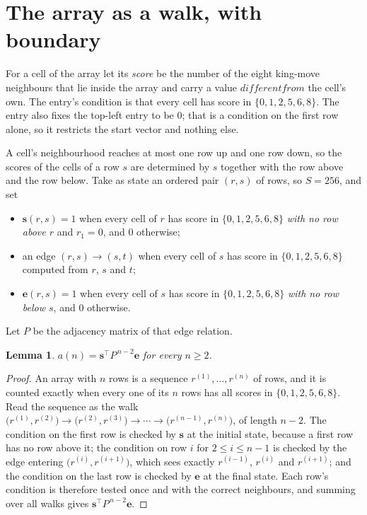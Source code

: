 \documentclass[11pt,a4paper]{article}
\theoremstyle{plain}
\newtheorem{lemma}[theorem]{Lemma}
\theoremstyle{definition}
\begin{document}
\section{The array as a walk, with boundary}

For a cell of the array let its \emph{score} be the number of the eight king-move neighbours that lie inside
the array and carry a value $different from$ the cell's own. The entry's condition is that every cell
has score in $\{0,1,2,5,6,8\}$. The entry also fixes the top-left entry to be $0$; that is a condition on the first row alone, so it restricts the start vector and nothing else.

A cell's neighbourhood reaches at most one row up and one row down, so the scores of the
cells of a row $s$ are determined by $s$ together with the row above and the row below.
Take as state an ordered pair $(r,s)$ of rows, so $S=256$, and set
\begin{itemize}
\item $\mathbf{s}(r,s)=1$ when every cell of $r$ has score in $\{0,1,2,5,6,8\}$ \emph{with no row
above $r$} and $r_1=0$, and $0$ otherwise;
\item an edge $(r,s)\to(s,t)$ when every cell of $s$ has score in $\{0,1,2,5,6,8\}$ computed from
$r$, $s$ and $t$;
\item $\mathbf{e}(r,s)=1$ when every cell of $s$ has score in $\{0,1,2,5,6,8\}$ \emph{with no row
below $s$}, and $0$ otherwise.
\end{itemize}
Let $P$ be the adjacency matrix of that edge relation.

\begin{lemma}\label{lem:walk}
$a(n)=\mathbf{s}^{\!\top}P^{\,n-2}\mathbf{e}$ for every $n\ge2$.
\end{lemma}

\begin{proof}
An array with $n$ rows is a sequence $r^{(1)},\dots,r^{(n)}$ of rows, and it is counted
exactly when every one of its $n$ rows has all scores in $\{0,1,2,5,6,8\}$. Read the sequence as the
walk $\bigl(r^{(1)},r^{(2)}\bigr)\to\bigl(r^{(2)},r^{(3)}\bigr)\to\cdots\to
\bigl(r^{(n-1)},r^{(n)}\bigr)$, of length $n-2$. The condition on the first row is
checked by $\mathbf{s}$ at the initial state, because a first row has no row above it; the
condition on row $i$ for $2\le i\le n-1$ is checked by the edge entering
$\bigl(r^{(i)},r^{(i+1)}\bigr)$, which sees exactly $r^{(i-1)}$, $r^{(i)}$ and
$r^{(i+1)}$; and the condition on the last row is checked by $\mathbf{e}$ at the final
state. Each row's condition is therefore tested once and with the correct neighbours, and
summing over all walks gives $\mathbf{s}^{\!\top}P^{\,n-2}\mathbf{e}$.
\end{proof}
\end{document}
